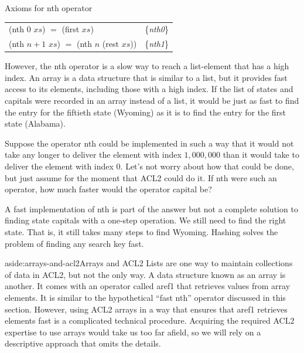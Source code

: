 \begin{center}
Axioms for \textsf{nth} operator
\begin{tabular}{ll}
\textsf{(nth 0} $xs$\textsf{)} $=$ \textsf{(first} $xs$\textsf{)}  & \{\emph{nth0}\}             \\
\textsf{(nth} $n+1$ $xs$\textsf{)} $=$ \textsf{(nth} $n$ \textsf{(rest} $xs$\textsf{))} & \{\emph{nth1}\} \\
\end{tabular}
\end{center}

However, the \textsf{nth} operator is a slow way to reach a
list-element that has a high index.
An array is a data structure that is
similar to a list, but it provides fast access to its
elements, including those with a high index.
If the list of states and capitals were recorded in an array instead
of a list, it would be just as fast to find the entry for the
fiftieth state (Wyoming) as it is to find the entry
for the first state (Alabama).

Suppose the operator \textsf{nth} could be implemented
in such a way that it would not take any longer to
deliver the element with index $1,000,000$ than it would take
to deliver the element with index $0$.
Let's not worry about how that could be done, but %
just assume for the moment that ACL2 could do it.
If \textsf{nth} were such an operator,
how much faster would the operator \textsf{capital} be?

A fast implementation of \textsf{nth} is part of the answer
but not a complete solution to finding state capitals
with a one-step operation.
We still need to find the right state.
That is, it still takes many steps to find Wyoming.
Hashing solves the problem of finding any search key fast.

\begin{aside}{aside:arrays-and-acl2}{Arrays and ACL2}
Lists are one way to maintain collections of data in ACL2,
but not the only way. A data structure
known as an array is another. It comes with an operator
called \textsf{aref1} that retrieves values from array elements.
It is similar to the hypothetical ``fast \textsf{nth}'' operator
discussed in this section. However, using ACL2 arrays in a way that
ensures that \textsf{aref1} retrieves elements fast
is a complicated technical procedure.
Acquiring the required ACL2 expertise to use arrays
would take us too far afield, so we will rely on a
descriptive approach that omits the details.
\end{aside}

